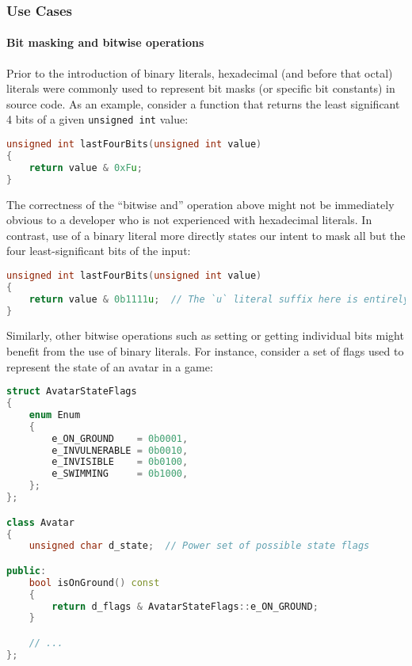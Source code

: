 \documentclass[twoside,10pt,letterpaper,usenames]{newstyle-PearsonGeneric-7-38}
\begin{document}
\subsubsection[Use Cases]{Use Cases}\label{use-cases}

\paragraph[Bit masking and bitwise operations]{Bit masking and bitwise operations}\label{bit-masking-and-bitwise-operations}

Prior to the introduction of binary literals, hexadecimal (and before
that octal) literals were commonly used to represent bit masks (or
specific bit constants) in source code. As an example, consider a
function that returns the least significant 4 bits of a given
\texttt{unsigned int} value:

\begin{lstlisting}[language=C++, caption={missing caption}, label={testlabel}, frame=tb]
unsigned int lastFourBits(unsigned int value)
{
    return value & 0xFu;
}
\end{lstlisting}
    

The correctness of the ``bitwise and'' operation above might not be
immediately obvious to a developer who is not experienced with
hexadecimal literals. In contrast, use of a binary literal more directly
states our intent to mask all but the four least-significant bits of the
input:

\begin{lstlisting}[language=C++, caption={missing caption}, label={testlabel}, frame=tb]
unsigned int lastFourBits(unsigned int value)
{
    return value & 0b1111u;  // The `u` literal suffix here is entirely optional.
}
\end{lstlisting}
    

Similarly, other bitwise operations such as setting or getting
individual bits might benefit from the use of binary literals. For
instance, consider a set of flags used to represent the state of an
avatar in a game:

\begin{lstlisting}[language=C++, caption={missing caption}, label={testlabel}, frame=tb]
struct AvatarStateFlags
{
    enum Enum
    {
        e_ON_GROUND    = 0b0001,
        e_INVULNERABLE = 0b0010,
        e_INVISIBLE    = 0b0100,
        e_SWIMMING     = 0b1000,
    };
};

class Avatar
{
    unsigned char d_state;  // Power set of possible state flags

public:
    bool isOnGround() const
    {
        return d_flags & AvatarStateFlags::e_ON_GROUND;
    }

    // ...
};
\end{lstlisting}
    
\end{document}
